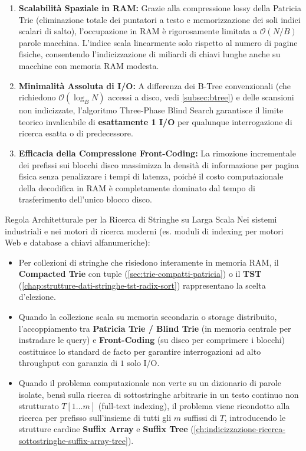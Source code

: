 \begin{enumerate}
  \item \textbf{Scalabilit\`a Spaziale in RAM:} Grazie alla compressione lossy della Patricia Trie (eliminazione totale dei puntatori a testo e memorizzazione dei soli indici scalari di salto), l'occupazione in RAM \`e rigorosamente limitata a $\mathcal{O}(N/B)$ parole macchina. L'indice scala linearmente solo rispetto al numero di pagine fisiche, consentendo l'indicizzazione di miliardi di chiavi lunghe anche su macchine con memoria RAM modesta.
  \item \textbf{Minimalit\`a Assoluta di I/O:} A differenza dei B-Tree convenzionali (che richiedono $\mathcal{O}(\log_B N)$ accessi a disco, vedi \autoref{subsec:btree}) e delle scansioni non indicizzate, l'algoritmo Three-Phase Blind Search garantisce il limite teorico invalicabile di \textbf{esattamente 1 I/O} per qualunque interrogazione di ricerca esatta o di predecessore.
  \item \textbf{Efficacia della Compressione Front-Coding:} La rimozione incrementale dei prefissi sui blocchi disco massimizza la densit\`a di informazione per pagina fisica senza penalizzare i tempi di latenza, poich\'e il costo computazionale della decodifica in RAM \`e completamente dominato dal tempo di trasferimento dell'unico blocco disco.
\end{enumerate}

\begin{noteblock}{Regola Architetturale per la Ricerca di Stringhe su Larga Scala}
Nei sistemi industriali e nei motori di ricerca moderni (es. moduli di indexing per motori Web e database a chiavi alfanumeriche):
\begin{itemize}
  \item Per collezioni di stringhe che risiedono interamente in memoria RAM, il \textbf{Compacted Trie} con tuple (\autoref{sec:trie-compatti-patricia}) o il \textbf{TST} (\autoref{chap:strutture-dati-stringhe-tst-radix-sort}) rappresentano la scelta d'elezione.
  \item Quando la collezione scala su memoria secondaria o storage distribuito, l'accoppiamento tra \textbf{Patricia Trie / Blind Trie} (in memoria centrale per instradare le query) e \textbf{Front-Coding} (su disco per comprimere i blocchi) costituisce lo standard de facto per garantire interrogazioni ad alto throughput con garanzia di $1$ solo I/O.
  \item Quando il problema computazionale non verte su un dizionario di parole isolate, bens\`i sulla ricerca di sottostringhe arbitrarie in un testo continuo non strutturato $T[1 \dots m]$ (full-text indexing), il problema viene ricondotto alla ricerca per prefisso sull'insieme di tutti gli $m$ suffissi di $T$, introducendo le strutture cardine \textbf{Suffix Array} e \textbf{Suffix Tree} (\autoref{ch:indicizzazione-ricerca-sottostringhe-suffix-array-tree}).
\end{itemize}
\end{noteblock}
